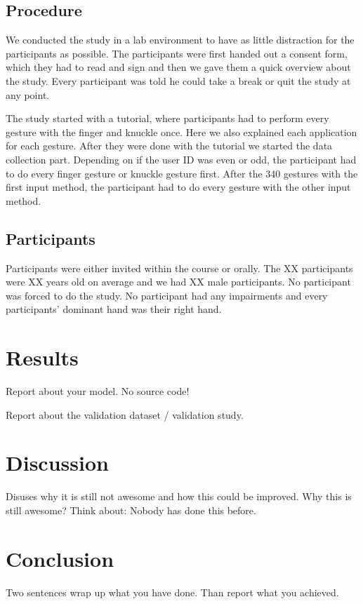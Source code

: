 \documentclass[sigchi-a, authorversion]{acmart}
\begin{document}
\subsection{Procedure}
We conducted the study in a lab environment to have as little distraction for the participants as possible.
The participants were first handed out a consent form, which they had to read and sign and then we gave them a quick overview about the study.
Every participant was told he could take a break or quit the study at any point.

The study started with a tutorial, where participants had to perform every gesture with the finger and knuckle once.
Here we also explained each application for each gesture.
After they were done with the tutorial we started the data collection part.
Depending on if the user ID was even or odd, the participant had to do every finger gesture or knuckle gesture first.
After the 340 gestures with the first input method, the participant had to do every gesture with the other input method.

\subsection{Participants}
Participants were either invited within the course or orally.
The XX participants were XX years old on average and we had XX male participants.
No participant was forced to do the study.
No participant had any impairments and every participants' dominant hand was their right hand. 
\section{Results}
Report about your model. No source code!

Report about the validation dataset / validation study. 
\section{Discussion}
Disuses why it is still not awesome and how this could be improved. Why this is still awesome? Think about: Nobody has done this before. 
\section{Conclusion}
Two sentences wrap up what you have done. Than report what you achieved. 
\end{document}
